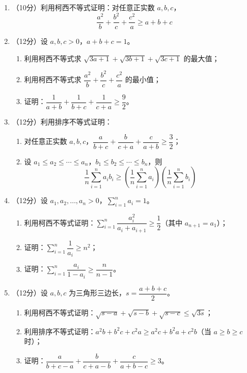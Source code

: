 \documentclass[12pt, a4paper]{ctexart}
\begin{document}
\vspace{0.3cm}

\begin{enumerate}[resume]
\item （10分）利用柯西不等式证明：对任意正实数 $a, b, c$，
$$\frac{a^2}{b} + \frac{b^2}{c} + \frac{c^2}{a} \geqslant a + b + c$$

\item （12分）设 $a, b, c > 0$，$a + b + c = 1$。
\begin{enumerate}[label=(\arabic*)]
\item 利用柯西不等式求 $\sqrt{3a + 1} + \sqrt{3b + 1} + \sqrt{3c + 1}$ 的最大值；
\item 利用柯西不等式求 $\dfrac{a^2}{b} + \dfrac{b^2}{c} + \dfrac{c^2}{a}$ 的最小值；
\item 证明：$\dfrac{1}{a+b} + \dfrac{1}{b+c} + \dfrac{1}{c+a} \geqslant \dfrac{9}{2}$。
\end{enumerate}

\item （12分）利用排序不等式证明：
\begin{enumerate}[label=(\arabic*)]
\item 对任意正实数 $a, b, c$，$\dfrac{a}{b+c} + \dfrac{b}{c+a} + \dfrac{c}{a+b} \geqslant \dfrac{3}{2}$；
\item 设 $a_1 \leqslant a_2 \leqslant \cdots \leqslant a_n$，$b_1 \leqslant b_2 \leqslant \cdots \leqslant b_n$，则
$$\frac{1}{n}\sum_{i=1}^{n} a_i b_i \geqslant \left(\frac{1}{n}\sum_{i=1}^{n} a_i\right)\left(\frac{1}{n}\sum_{i=1}^{n} b_i\right)$$
\end{enumerate}

\item （12分）设 $a_1, a_2, \ldots, a_n > 0$，$\displaystyle\sum_{i=1}^{n} a_i = 1$。
\begin{enumerate}[label=(\arabic*)]
\item 利用柯西不等式证明：$\displaystyle\sum_{i=1}^{n} \dfrac{a_i^2}{a_i + a_{i+1}} \geqslant \dfrac{1}{2}$（其中 $a_{n+1} = a_1$）；
\item 证明：$\displaystyle\sum_{i=1}^{n} \dfrac{1}{a_i} \geqslant n^2$；
\item 证明：$\displaystyle\sum_{i=1}^{n} \dfrac{a_i}{1 - a_i} \geqslant \dfrac{n}{n-1}$。
\end{enumerate}

\item （12分）设 $a, b, c$ 为三角形三边长，$s = \dfrac{a+b+c}{2}$。
\begin{enumerate}[label=(\arabic*)]
\item 利用柯西不等式证明：$\sqrt{s-a} + \sqrt{s-b} + \sqrt{s-c} \leqslant \sqrt{3s}$；
\item 利用排序不等式证明：$a^2 b + b^2 c + c^2 a \geqslant a^2 c + b^2 a + c^2 b$（当 $a \geqslant b \geqslant c$ 时）；
\item 证明：$\dfrac{a}{b+c-a} + \dfrac{b}{c+a-b} + \dfrac{c}{a+b-c} \geqslant 3$。
\end{enumerate}


\end{enumerate}
\end{document}

